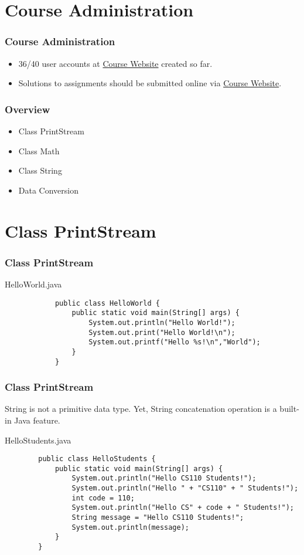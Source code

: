 \documentclass[10pt, compress]{beamer}
\begin{document}
\prepareCover

\section{Course Administration}

\begin{frame}[fragile]
\frametitle{Course Administration}
	\begin{itemize}
		\item[] 36/40 user accounts at \href{http://www.ghorbanzade.com}{Course Website} created so far.
		\item[] Solutions to assignments should be submitted online via \href{http://www.ghorbanzade.com}{Course Website}.
	\end{itemize}
\end{frame}

\begin{frame}[fragile]
	\frametitle{Overview}
	\begin{itemize}
		\item[] Class PrintStream
		\item[] Class Math
		\item[] Class String
		\item[] Data Conversion
	\end{itemize}
\end{frame}

\section{Class PrintStream}

\begin{frame}[fragile]
	\frametitle{Class PrintStream}
	\begin{block}{HelloWorld.java}
		\begin{verbatim}
			public class HelloWorld {
			    public static void main(String[] args) {
			        System.out.println("Hello World!");
			        System.out.print("Hello World!\n");
			        System.out.printf("Hello %s!\n","World");
			    }
			}
		\end{verbatim}
	\end{block}
\end{frame}

\begin{frame}[fragile]
	\frametitle{Class PrintStream}
	String is not a primitive data type. Yet, String concatenation operation is a built-in Java feature.
	\begin{block}{HelloStudents.java}
	\begin{verbatim}
		public class HelloStudents {
		    public static void main(String[] args) {
		        System.out.println("Hello CS110 Students!");
		        System.out.println("Hello " + "CS110" + " Students!");
		        int code = 110;
		        System.out.println("Hello CS" + code + " Students!");
		        String message = "Hello CS110 Students!";
		        System.out.println(message);
		    }
		}
	\end{verbatim}
	\end{block}
\end{frame}
\end{document}

